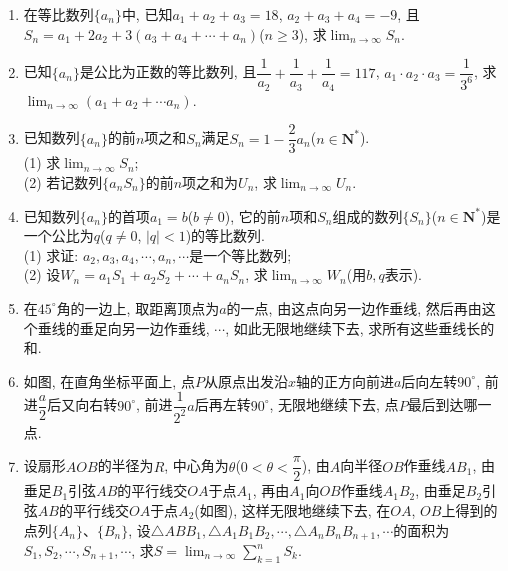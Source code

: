 \documentclass[10pt,a4paper]{article}
\begin{document}
\begin{enumerate}[1.]
\item 在等比数列$\{a_n\}$中, 已知$a_1+a_2+a_3=18$, $a_2+a_3+a_4=-9$, 且$S_n=a_1+2a_2+3(a_3+a_4+\cdots +a_n)$($n\ge 3$), 求$\displaystyle \lim_{n\to \infty} S_n$.
\item 已知$\{a_n\}$是公比为正数的等比数列, 且$\dfrac 1{a_2}+\dfrac 1{a_3}+\dfrac 1{a_4}=117$, $a_1\cdot a_2\cdot a_3=\dfrac 1{3^6}$, 求$\displaystyle \lim_{n\to \infty} (a_1+a_2+\cdots a_n)$.
\item 已知数列$\{a_n\}$的前$n$项之和$S_n$满足$S_n=1-\dfrac 23a_n$($n\in \mathbf{N}^*$).\\
(1) 求$\displaystyle \lim_{n\to \infty} S_n$;\\
(2) 若记数列$\{a_nS_n\}$的前$n$项之和为$U_n$, 求$\displaystyle \lim_{n\to \infty} U_n$.
\item 已知数列$\{a_n\}$的首项$a_1=b$($b\ne 0$), 它的前$n$项和$S_n$组成的数列$\{S_n\}$($n\in \mathbf{N}^*$)是一个公比为$q$($q\ne 0$, $|q|<1$)的等比数列.\\
(1) 求证: $a_2,a_3,a_4,\cdots ,a_n,\cdots$是一个等比数列;\\
(2) 设$W_n=a_1S_1+a_2S_2+\cdots +a_nS_n$, 求$\displaystyle \lim_{n\to \infty} W_n$(用$b,q$表示).
\item 在$45^\circ$角的一边上, 取距离顶点为$a$的一点, 由这点向另一边作垂线, 然后再由这个垂线的垂足向另一边作垂线, $\cdots$, 如此无限地继续下去, 求所有这些垂线长的和.
\item 如图, 在直角坐标平面上, 点$P$从原点出发沿$x$轴的正方向前进$a$后向左转$90^\circ$, 前进$\dfrac a2$后又向右转$90^\circ$, 前进$\dfrac 1{2^2}a$后再左转$90^\circ$, 无限地继续下去, 点$P$最后到达哪一点.
\begin{center}
\end{center}
\item 设扇形$AOB$的半径为$R$, 中心角为$\theta$($0<\theta <\dfrac{\pi }2$), 由$A$向半径$OB$作垂线$AB_1$, 由垂足$B_1$引弦$AB$的平行线交$OA$于点$A_1$, 再由$A_1$向$OB$作垂线$A_1B_2$, 由垂足$B_2$引弦$AB$的平行线交$OA$于点$A_2$(如图), 这样无限地继续下去, 在$OA$, $OB$上得到的点列$\{A_n\}$、$\{B_n\}$, 设$\triangle ABB_1,\triangle A_1B_1B_2,\cdots,\triangle A_nB_nB_{n+1},\cdots$的面积为$S_1,S_2,\cdots,S_{n+1},\cdots$, 求$S=\displaystyle \lim_{n\to \infty} \sum\limits_{k=1}^nS_k$.

\end{enumerate}
\end{document}

